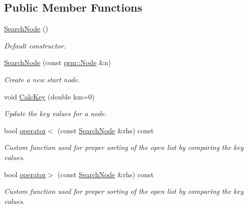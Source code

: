 \subsection*{Public Member Functions}
\begin{DoxyCompactItemize}
\item 
\mbox{\label{structhsearch_1_1SearchNode_a1e461dc25eef2e8de76dd7bd70042e22}} 
\hyperlink{structhsearch_1_1SearchNode_a1e461dc25eef2e8de76dd7bd70042e22}{Search\+Node} ()
\begin{DoxyCompactList}\small\item\em Default constructor. \end{DoxyCompactList}\item 
\hyperlink{structhsearch_1_1SearchNode_abc34e7eab1d4b3d269f9b360b77936a5}{Search\+Node} (const \hyperlink{structprm_1_1Node}{prm\+::\+Node} \&n)
\begin{DoxyCompactList}\small\item\em Create a new start node. \end{DoxyCompactList}\item 
void \hyperlink{structhsearch_1_1SearchNode_a0b8eea07c7013c327c70723182e43561}{Calc\+Key} (double km=0)
\begin{DoxyCompactList}\small\item\em Update the key values for a node. \end{DoxyCompactList}\item 
bool \hyperlink{structhsearch_1_1SearchNode_a936d6ea25917367b88adde4748c9143c}{operator$<$} (const \hyperlink{structhsearch_1_1SearchNode}{Search\+Node} \&rhs) const
\begin{DoxyCompactList}\small\item\em Custom function used for proper sorting of the open list by comparing the key values. \end{DoxyCompactList}\item 
bool \hyperlink{structhsearch_1_1SearchNode_a492955fe1a5cdfae1dc0474232cb7175}{operator$>$} (const \hyperlink{structhsearch_1_1SearchNode}{Search\+Node} \&rhs) const
\begin{DoxyCompactList}\small\item\em Custom function used for proper sorting of the open list by comparing the key values. \end{DoxyCompactList}\end{DoxyCompactItemize}
